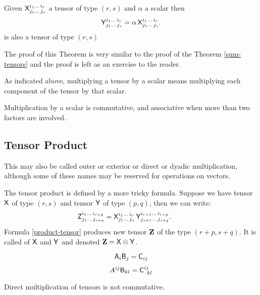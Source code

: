 \begin{theorem}
 Given $\mathsf{X}^{i_1\ldots\,i_r}_{j_1\ldots\,j_s}$ a tensor of type $(r,s)$  and $\alpha$ a scalar then 
$$
\mathsf{Y}^{i_1\ldots\,i_r}_{j_1\ldots\,j_s}=\alpha\,
\mathsf{X}^{i_1\ldots\,i_r}_{j_1\ldots\,j_s}.
$$
is also a tensor of type $(r,s)$
\end{theorem}
The proof of this Theorem is very similar to the proof of the Theorem \ref{sum-tensors} and the proof is left as an exercise to the reader.



 As indicated above, multiplying a tensor by a scalar means
multiplying each component of the tensor by that scalar.

 Multiplication by a scalar is commutative, and associative
when more than two factors are involved.


\subsection{Tensor Product \label{subTensorMultiplication} }

 This may also be called outer or exterior or direct or
dyadic multiplication, although some of these names may be reserved
for operations on vectors.

   The tensor product is defined by a more tricky formula. Suppose
we have tensor $\mathsf{X}$ of type $(r,s)$ and tensor $\mathsf{Y}$
of type $(p,q)$, then we can write:
$$
\hskip -2em
\tsor{Z}^{i_1\ldots\,i_{r+p}}_{j_1\ldots\,j_{s+q}}=
\tsor{X}^{i_1\ldots\,i_r}_{j_1\ldots\,j_s}\,
\tsor{Y}^{i_{r+1}\ldots\,i_{r+p}}_{j_{s+1}\ldots\,j_{s+q}}.
\label{product-tensor}
$$
Formula \ref{product-tensor} produces new tensor $\bold Z$
of the type $(r+p,s+q)$. It is called 
of $\mathsf{X}$ and $\mathsf{Y}$ and denoted $\bold Z=\mathsf{X}
\otimes\mathsf{Y}$. 


\begin{exa}
 \begin{equation}
\mathsf{A}_{i}\mathsf{B}_{j}=\mathsf{C}_{ij}
\end{equation}
\begin{equation}
A^{ij}\mathsf{B}_{kl}=\mathsf{C}_{\,\,\,kl}^{ij}
\end{equation}
\end{exa}



 Direct multiplication of tensors is not commutative.

